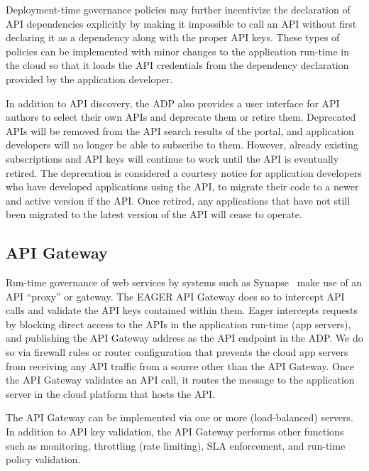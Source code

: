 Deployment-time governance policies
may further incentivize the declaration of API 
dependencies explicitly by making it 
impossible to call an API without first declaring it as a dependency along
with the proper API keys. These types of policies can be implemented
with minor changes to the
application run-time in the cloud so that it loads the API credentials from
the dependency declaration provided by the application developer.

In addition to API discovery, the ADP also provides a user
interface for API authors to select their own APIs and deprecate them or
retire them. Deprecated APIs will be removed from the API search
results of the portal, and application developers will no longer be able to 
subscribe to them. However, already existing subscriptions and API keys will continue
to work until the API is eventually retired. 
The deprecation is considered a courtesy notice for application developers
who have developed applications using the API, to migrate their code to a newer and active version
if the API. 
Once retired, any applications that have
not still been migrated to the latest version of the API will cease to operate.

\subsection{API Gateway} 
Run-time governance of web services by systems such as
Synapse~\cite{synapse} make use of an API ``proxy'' or gateway.
The EAGER API Gateway does so to intercept API calls and validate 
the API keys contained within them.
Eager intercepts requests by blocking direct access to the APIs in the
application run-time (app servers), and publishing the API Gateway address as
the API endpoint in the ADP. We do so via firewall rules
or router configuration that prevents the cloud app servers from receiving any
API traffic from a source other than the API Gateway. Once the API Gateway validates
an API call, it routes the message to the
application server in the cloud platform that hosts the API.

The API Gateway can be implemented via one or more (load-balanced) servers.
In addition to API key validation, the API Gateway performs other
functions such as monitoring, throttling (rate limiting), SLA
enforcement, and run-time policy validation. 
